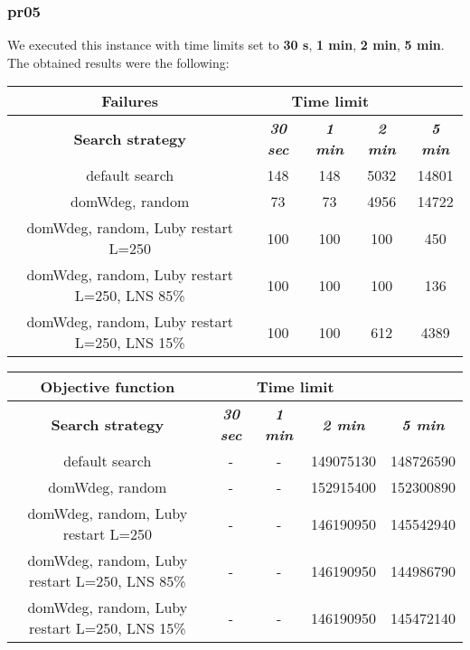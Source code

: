 \subsubsection{pr05}
We executed this instance with time limits set to \textbf{30 s}, \textbf{1 min}, \textbf{2 min}, \textbf{5 min}.\\
The obtained results were the following:
{
\renewcommand{\arraystretch}{2}
\begin{longtable}[h]{| c | c | c | c | c |}
    \hline
    \textbf{Failures} & \multicolumn{3}{c}{Time limit} & \\
    \hline
    \textbf{Search strategy} & \textbf{\textit{30 sec}} & \textbf{\textit{1 min}} & \textbf{\textit{2 min}} & \textbf{\textit{5 min}} \\
    \hline
    \endhead
    default search                                & 148 &  148 &  5032 &  14801 \\
    \hline
    domWdeg, random                               &  73 &   73 &  4956 &  14722 \\
    \hline
    domWdeg, random, Luby restart L=250           & 100 &  100 &   100 &    450 \\
    \hline
    domWdeg, random, Luby restart L=250, LNS 85\% & 100 &  100 &   100 &    136 \\
    \hline
    domWdeg, random, Luby restart L=250, LNS 15\% & 100 &  100 &   612 &   4389 \\
    \hline
\end{longtable}
}

{
\renewcommand{\arraystretch}{2}
\begin{longtable}[h]{| c | c | c | c | c |}
    \hline
    \textbf{Objective function} & \multicolumn{3}{c}{Time limit} & \\
    \hline
    \textbf{Search strategy} & \textbf{\textit{30 sec}} & \textbf{\textit{1 min}} & \textbf{\textit{2 min}} & \textbf{\textit{5 min}} \\
    \hline
    \endhead
    default search                                & - & - & 149075130 & 148726590 \\
    \hline
    domWdeg, random                               & - & - & 152915400 & 152300890 \\
    \hline
    domWdeg, random, Luby restart L=250           & - & - & 146190950 & 145542940 \\
    \hline
    domWdeg, random, Luby restart L=250, LNS 85\% & - & - & 146190950 & 144986790 \\
    \hline
    domWdeg, random, Luby restart L=250, LNS 15\% & - & - & 146190950 & 145472140 \\
    \hline
\end{longtable}
}